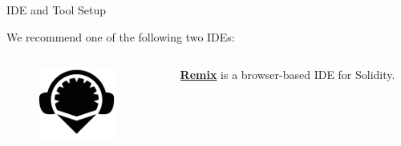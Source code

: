 \documentclass[]{beamer}
\begin{document}
\begin{frame}{IDE and Tool Setup}
		
	We recommend one of the following two IDEs:\\
	
	\begin{columns}
		\begin{column}{0.1\textwidth}
			\begin{figure}		\includegraphics[width = \textwidth]{../assets/images/logo_remix.png}
			\end{figure}
		\end{column}
		\begin{column}{0.85\textwidth}
			\textbf{\href{https://remix.ethereum.org/}{\link Remix}} is a browser-based IDE for Solidity.\\
		\end{column}
	\end{columns}
	

\end{frame}
\end{document}
